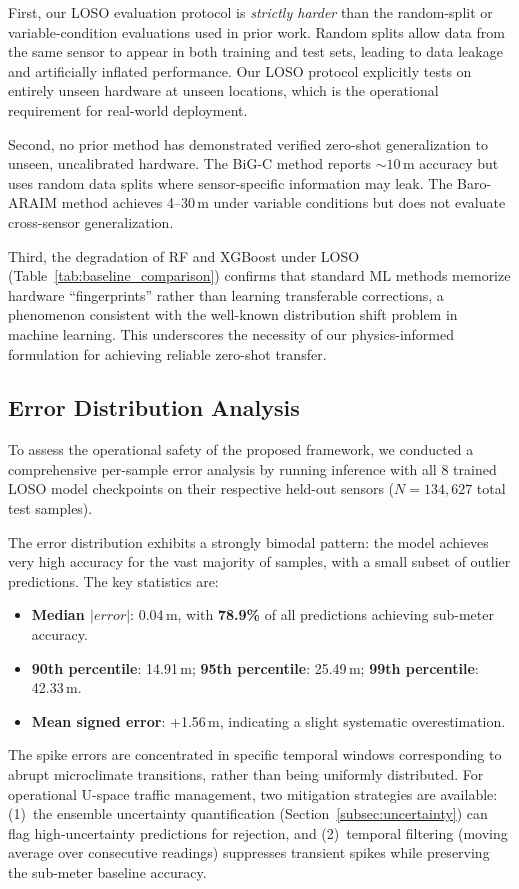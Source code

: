 First, our LOSO evaluation protocol is \emph{strictly harder} than the random-split or variable-condition evaluations used in prior work. Random splits allow data from the same sensor to appear in both training and test sets, leading to data leakage and artificially inflated performance. Our LOSO protocol explicitly tests on entirely unseen hardware at unseen locations, which is the operational requirement for real-world deployment.

Second, no prior method has demonstrated verified zero-shot generalization to unseen, uncalibrated hardware. The BiG-C method \cite{narayanan2022enhanced} reports ${\sim}10$\,m accuracy but uses random data splits where sensor-specific information may leak. The Baro-ARAIM method \cite{simonetti2024geodetic} achieves 4--30\,m under variable conditions but does not evaluate cross-sensor generalization.

Third, the degradation of RF and XGBoost under LOSO (Table~\ref{tab:baseline_comparison}) confirms that standard ML methods memorize hardware ``fingerprints'' rather than learning transferable corrections, a phenomenon consistent with the well-known distribution shift problem in machine learning. This underscores the necessity of our physics-informed formulation for achieving reliable zero-shot transfer.

\subsection{Error Distribution Analysis}
\label{subsec:error_distribution}

To assess the operational safety of the proposed framework, we conducted a comprehensive per-sample error analysis by running inference with all 8 trained LOSO model checkpoints on their respective held-out sensors ($N = 134{,}627$ total test samples).

The error distribution exhibits a strongly bimodal pattern: the model achieves very high accuracy for the vast majority of samples, with a small subset of outlier predictions. The key statistics are:
\begin{itemize}
    \item \textbf{Median $|error|$}: 0.04\,m, with \textbf{78.9\%} of all predictions achieving sub-meter accuracy.
    \item \textbf{90th percentile}: 14.91\,m; \textbf{95th percentile}: 25.49\,m; \textbf{99th percentile}: 42.33\,m.
    \item \textbf{Mean signed error}: +1.56\,m, indicating a slight systematic overestimation.
\end{itemize}

The spike errors are concentrated in specific temporal windows corresponding to abrupt microclimate transitions, rather than being uniformly distributed. For operational U-space traffic management, two mitigation strategies are available: (1)~the ensemble uncertainty quantification (Section~\ref{subsec:uncertainty}) can flag high-uncertainty predictions for rejection, and (2)~temporal filtering (moving average over consecutive readings) suppresses transient spikes while preserving the sub-meter baseline accuracy.
